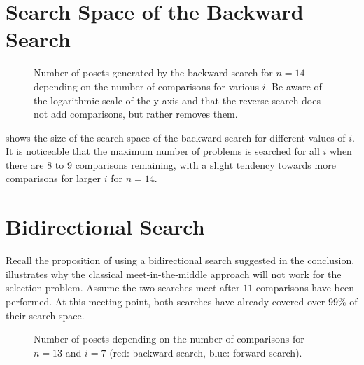 \documentclass[a4paper,UKenglish,cleveref, autoref, thm-restate, anonymous]{lipics-v2021}
\begin{document}
\section{Search Space of the Backward Search}
\begin{figure}[!b]
  \centering
  
  \caption{Number of posets generated by the backward search for $n = 14$ depending on the number of comparisons for various $i$.
    Be aware of the logarithmic scale of the y-axis and that the reverse search does not add comparisons, but rather removes them.}
  \label{fig:backward-posets-per-level}
\end{figure}

 shows the size of the search space of the backward search for different values of $i$.
It is noticeable that the maximum number of problems is searched for all $i$ when there are $8$ to $9$ comparisons remaining, with a slight tendency towards more comparisons for larger $i$ for $n = 14$.

\section{Bidirectional Search}
Recall the proposition of using a bidirectional search suggested in the conclusion.
 illustrates why the classical meet-in-the-middle approach will not work for the selection problem.
Assume the two searches meet after $11$ comparisons have been performed.
At this meeting point, both searches have already covered over $99\%$ of their search space.

\begin{figure}[!b]
  \centering
  
  \caption{Number of posets depending on the number of comparisons for $n = 13$ and $i = 7$ (red: backward search, blue: forward search).}
  \label{fig:backward_forward_count_13_6}
\end{figure}
\end{document}

